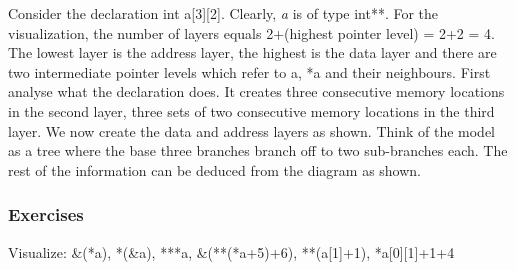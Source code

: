 \documentclass[10pt,twoside]{article}
\begin{document}
Consider the declaration int a[3][2]. Clearly, \textit{a }\textup{is of type
int**. For the visualization, the number of layers equals 2+(highest pointer
level) = 2+2 = 4. The lowest layer is the address layer, the highest is the data
layer and there are two intermediate pointer levels which refer to a, *a and
their neighbours.  First analyse what the declaration does. It creates three
consecutive memory locations in the second layer, three sets of two consecutive
memory locations in the third layer. We now create the data and address layers
as shown. Think of the model as a tree where the base three branches branch off
to two sub-branches each. The rest of the information can be deduced from the
diagram as shown.}

\subsubsection*{Exercises}
Visualize: \&(*a), *(\&a), ***a, \&(**(*a+5)+6), **(a[1]+1),
*a[0][1]+1+4
\newpage
\end{document}
